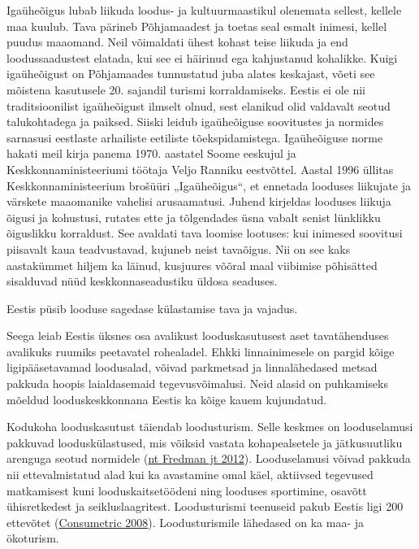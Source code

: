 \documentclass[estonian,]{article}
\begin{document}
Igaüheõigus lubab liikuda loodus- ja kultuurmaastikul olenemata sellest, kellele maa kuulub. Tava pärineb Põhjamaadest ja toetas seal esmalt inimesi, kellel puudus maaomand. Neil võimaldati ühest kohast teise liikuda ja end loodussaadustest elatada, kui see ei häirinud ega kahjustanud kohalikke. Kuigi igaüheõigust on Põhjamaades tunnustatud juba alates keskajast, võeti see mõistena kasutusele 20. sajandil turismi korraldamiseks. Eestis ei ole nii traditsioonilist igaüheõigust ilmselt olnud, sest elanikud olid valdavalt seotud talukohtadega ja paiksed. Siiski leidub igaüheõiguse soovitustes ja normides sarnasusi eestlaste arhailiste eetiliste tõekspidamistega. Igaüheõiguse norme hakati meil kirja panema 1970. aastatel Soome eeskujul ja Keskkonnaministeeriumi töötaja Veljo Ranniku eestvõttel. Aastal 1996 üllitas Keskkonnaministeerium brošüüri „Igaüheõigus``, et ennetada looduses liikujate ja värskete maaomanike vahelisi arusaamatusi. Juhend kirjeldas looduses liikuja õigusi ja kohustusi, rutates ette ja tõlgendades üsna vabalt senist lünklikku õiguslikku korraldust. See avaldati tava loomise lootuses: kui inimesed soovitusi piisavalt kaua teadvustavad, kujuneb neist tavaõigus. Nii on see kaks aastakümmet hiljem ka läinud, kusjuures võõral maal viibimise põhisätted sisalduvad nüüd keskkonnaseadustiku üldosa seaduses.

\begin{blockquote-left}
Eestis püsib looduse sagedase külastamise tava ja vajadus.
\end{blockquote-left}

Seega leiab Eestis üksnes osa avalikust looduskasutusest aset tavatähenduses avalikuks ruumiks peetavatel rohealadel. Ehkki linnainimesele on pargid kõige ligipääsetavamad loodusalad, võivad parkmetsad ja linnalähedased metsad pakkuda hoopis laialdasemaid tegevusvõimalusi. Neid alasid on puhkamiseks mõeldud looduskeskkonnana Eestis ka kõige kauem kujundatud.

Kodukoha looduskasutust täiendab loodusturism. Selle keskmes on looduselamusi pakkuvad looduskülastused, mis võiksid vastata kohapealsetele ja jätkusuutliku arenguga seotud normidele (\protect\hyperlink{Fredman2012}{nt Fredman jt 2012}). Looduselamusi võivad pakkuda nii ettevalmistatud alad kui ka avastamine omal käel, aktiivsed tegevused matkamisest kuni looduskaitsetöödeni ning looduses sportimine, osavõtt ühisretkedest ja seikluslaagritest. Loodusturismi teenuseid pakub Eestis ligi 200 ettevõtet (\protect\hyperlink{Consumetric2008}{Consumetric 2008}). Loodusturismile lähedased on ka maa- ja ökoturism.
\end{document}
